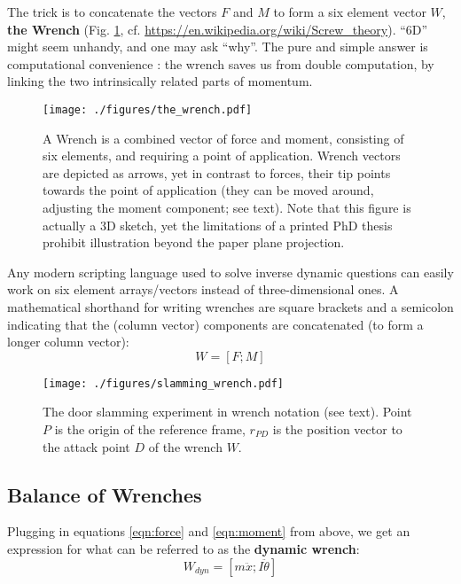The trick is to concatenate the vectors \(F\) and \(M\) to form a six element vector \(W\), \textbf{the Wrench} (Fig. \ref{fig:wrench}, cf. \url{https://en.wikipedia.org/wiki/Screw\_theory}).
``6D'' might seem unhandy, and one may ask ``why''.
The pure and simple answer is computational convenience \citep{Dumas2004,Mueller2018}: the wrench saves us from double computation, by linking the two intrinsically related parts of momentum.

\begin{figure}[htbp]
\centering
\texttt{[image: ./figures/the\_wrench.pdf]}
\caption{\label{fig:wrench}A Wrench is a combined vector of force and moment, consisting of six elements, and requiring a point of application. Wrench vectors are depicted as arrows, yet in contrast to forces, their tip points towards the point of application (they can be moved around, adjusting the moment component; see text). Note that this figure is actually a 3D sketch, yet the limitations of a printed PhD thesis prohibit illustration beyond the paper plane projection.}
\end{figure}


Any modern scripting language used to solve inverse dynamic questions can easily work on six element arrays/vectors instead of three-dimensional ones.
A mathematical shorthand for writing wrenches are square brackets and a semicolon indicating that the (column vector) components are concatenated (to form a longer column vector):
\[W = \left[ F; M \right]\]

\begin{figure}[htbp]
\centering
\texttt{[image: ./figures/slamming\_wrench.pdf]}
\caption{\label{fig:slamming_wrench}The door slamming experiment in wrench notation (see text). Point \(P\) is the origin of the reference frame, \(r_{PD}\) is the position vector to the attack point \(D\) of the wrench \(W\).}
\end{figure}


\subsection{Balance of Wrenches}
\label{sec:org16e34bd}
Plugging in equations \eqref{eqn:force} and \eqref{eqn:moment} from above, we get an expression for what can be referred to as the \textbf{dynamic wrench}:
\begin{equation}\label{eqn:dynamic_wrench}
W_{dyn} = \left[ m\ddot x; I\ddot \theta \right]
\end{equation}

